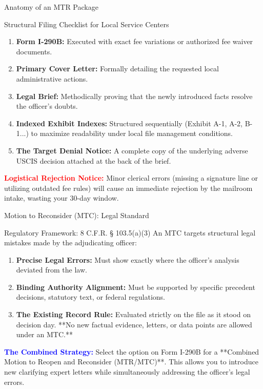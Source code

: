 \documentclass[11pt]{beamer}
\begin{document}
	\begin{frame}{Anatomy of an MTR Package}
		\scriptsize
		\begin{block}{Structural Filing Checklist for Local Service Centers}
			\begin{enumerate}
				\item \textbf{Form I-290B:} Executed with exact fee variations or authorized fee waiver documents.
				\item \textbf{Primary Cover Letter:} Formally detailing the requested local administrative actions.
				\item \textbf{Legal Brief:} Methodically proving that the newly introduced facts resolve the officer's doubts.
				\item \textbf{Indexed Exhibit Indexes:} Structured sequentially (Exhibit A-1, A-2, B-1...) to maximize readability under local file management conditions.
				\item \textbf{The Target Denial Notice:} A complete copy of the underlying adverse USCIS decision attached at the back of the brief.
			\end{enumerate}
			\vspace{0.1in}
			\textcolor{red}{\textbf{Logistical Rejection Notice:}} Minor clerical errors (missing a signature line or utilizing outdated fee rules) will cause an immediate rejection by the mailroom intake, wasting your 30-day window.
		\end{block}
	\end{frame}
	
	\begin{frame}{Motion to Reconsider (MTC): Legal Standard}
		\scriptsize
		\begin{block}{Regulatory Framework: 8 C.F.R. § 103.5(a)(3)}
			An MTC targets structural legal mistakes made by the adjudicating officer:
			\begin{enumerate}
				\item \textbf{Precise Legal Errors:} Must show exactly where the officer's analysis deviated from the law.
				\item \textbf{Binding Authority Alignment:} Must be supported by specific precedent decisions, statutory text, or federal regulations.
				\item \textbf{The Existing Record Rule:} Evaluated strictly on the file as it stood on decision day. **No new factual evidence, letters, or data points are allowed under an MTC.**
			\end{enumerate}
			\vspace{0.15cm}
			\textcolor{blue}{\textbf{The Combined Strategy:}} Select the option on Form I-290B for a **Combined Motion to Reopen and Reconsider (MTR/MTC)**. This allows you to introduce new clarifying expert letters while simultaneously addressing the officer's legal errors.
		\end{block}
	\end{frame}
	
\end{document}
